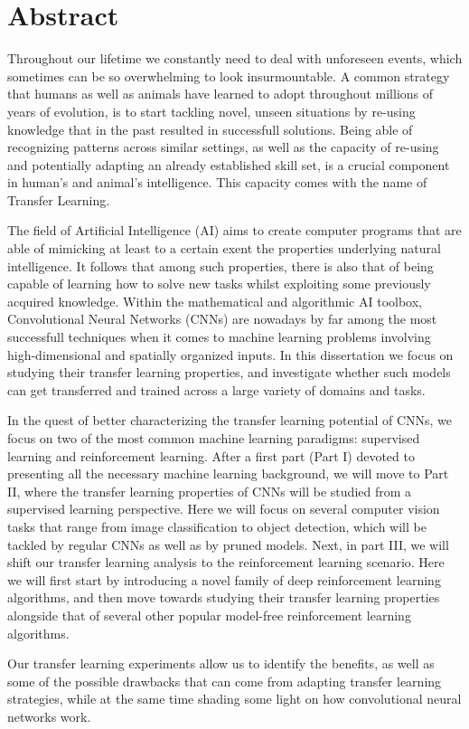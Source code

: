 


\begingroup
\let\clearpage\relax
\let\cleardoublepage\relax
\let\cleardoublepage\relax

\chapter*{Abstract}
Throughout our lifetime we constantly need to deal with unforeseen events, which sometimes can be so overwhelming to look insurmountable. A common strategy that humans as well as animals have learned to adopt throughout millions of years of evolution, is to start tackling novel, unseen situations by re-using knowledge that in the past resulted in successfull solutions. Being able of recognizing patterns across similar settings, as well as the capacity of re-using and potentially adapting an already established skill set, is a crucial component in human's and animal's intelligence. This capacity comes with the name of Transfer Learning. 

The field of Artificial Intelligence (AI) aims to create computer programs that are able of mimicking at least to a certain exent the properties underlying natural intelligence. It follows that among such properties, there is also that of being capable of learning how to solve new tasks whilst exploiting some previously acquired knowledge. Within the mathematical and algorithmic AI toolbox, Convolutional Neural Networks (CNNs) are nowadays by far among the most successfull techniques when it comes to machine learning problems involving high-dimensional and spatially organized inputs. In this dissertation we focus on studying their transfer learning properties, and investigate whether such models can get transferred and trained across a large variety of domains and tasks.

In the quest of better characterizing the transfer learning potential of CNNs, we focus on two of the most common machine learning paradigms: supervised learning and reinforcement learning. After a first part (Part I) devoted to presenting all the necessary machine learning background, we will move to Part II, where the transfer learning properties of CNNs will be studied from a supervised learning perspective. Here we will focus on several computer vision tasks that range from image classification to object detection, which will be tackled by regular CNNs as well as by pruned models. Next, in part III, we will shift our transfer learning analysis to the reinforcement learning scenario. Here we will first start by introducing a novel family of deep reinforcement learning algorithms, and then move towards studying their transfer learning properties alongside that of several other popular model-free reinforcement learning algorithms. 

Our transfer learning experiments allow us to identify the benefits, as well as some of the possible drawbacks that can come from adapting transfer learning strategies, while at the same time shading some light on how convolutional neural networks work. 

\endgroup			

\vfill

